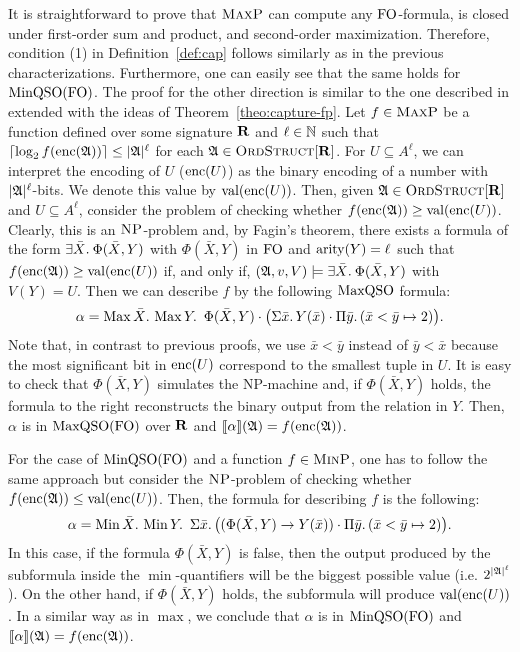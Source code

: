 It is straightforward to prove that $\text{\sc MaxP}$ can compute any ${\rm FO}$-formula, is closed under first-order sum and product, and second-order maximization. 
Therefore, condition (1) in Definition~\ref{def:cap} follows similarly as in the previous characterizations. Furthermore, one can easily see that the same holds for ${\rm MinQSO}({\rm FO})$.
The proof for the other direction is similar to the one described in \cite{kolaitis1994logical} extended with the ideas of Theorem~\ref{theo:capture-fp}. Let $f\in \text{\sc MaxP}$ be a function defined over some signature $\mathbf{R}$ and
$\ell\in\mathbb{N}$ such that $\lceil\log_2 f({\rm enc}(\mathfrak{A})) \rceil \leq |\mathfrak{A}|^\ell$ for each $\mathfrak{A}\in\text{\sc OrdStruct}[\mathbf{R}]$.
For $U \subseteq A^{\ell}$, we can interpret the encoding of $U$ (${\rm enc}(U)$) as the binary encoding of a number with $|\mathfrak{A}|^\ell$-bits. We denote this value by $\text{\rm val}({\rm enc}(U))$.
Then, given $\mathfrak{A}\in\text{\sc OrdStruct}[\mathbf{R}]$ and $U \subseteq A^{\ell}$, consider the problem of checking whether $f({\rm enc}(\mathfrak{A})) \geq \text{\rm val}({\rm enc}(U))$. 
Clearly, this is an $\text{\sc NP}$-problem and, by Fagin's theorem, there exists a formula of the form $\exists{\bar{X}}.\: \Phi(\bar{X}, Y)$ with $\Phi(\bar{X}, Y)$ in ${\rm FO}$ and ${\rm arity}(Y) = \ell$ such that $f({\rm enc}(\mathfrak{A})) \geq \text{\rm val}({\rm enc}(U))$ if, and only if, $(\mathfrak{A},v,V) \models \exists{\bar{X}}.\: \Phi(\bar{X}, Y)$ with $V(Y) = U$. 
Then we can describe $f$ by the following ${\rm MaxQSO}$ formula:
$$
\alpha = \maxa{\bar{X}} \maxa{Y} \ \Phi(\bar{X}, Y) \cdot \big( \sa{\bar{x}} Y(\bar{x}) \cdot \pa{\bar{y}}(\bar{x} < \bar{y} \mapsto 2) \big).
$$
Note that, in contrast to previous proofs, we use $\bar{x} < \bar{y}$ instead of $\bar{y} < \bar{x}$ because the most significant bit in ${\rm enc}(U)$ correspond to the smallest tuple in $U$.  
It is easy to check that $\Phi(\bar{X}, Y)$ simulates the NP-machine and, if $\Phi(\bar{X}, Y)$ holds, the formula to the right  reconstructs the binary output from the relation in $Y$.
Then, $\alpha$ is in ${\rm MaxQSO}({\rm FO})$ over $\mathbf{R}$ and ${\llbracket{}{\alpha}\rrbracket}(\mathfrak{A}) = f({\rm enc}(\mathfrak{A}))$. 

For the case of ${\rm MinQSO}({\rm FO})$ and a function $f \in \text{\sc MinP}$, one has to follow the same approach but consider the $\text{\sc NP}$-problem of checking whether $f({\rm enc}(\mathfrak{A})) \leq \text{\rm val}({\rm enc}(U))$. Then, the formula for describing $f$ is the following:
$$
\alpha = \operatorname{Min}{\bar{X}}.\, \operatorname{Min}{Y}.\, \ \Sigma{\bar{x}}.\, \big( (\Phi(\bar{X}, Y) \rightarrow Y(\bar{x})) \cdot \Pi{\bar{y}}.\,(\bar{x} < \bar{y} \mapsto 2)  \big).
$$
In this case, if the formula $\Phi(\bar{X}, Y)$ is false, then the output produced by the subformula inside the $\min$-quantifiers will be the biggest possible value (i.e. $2^{{|\mathfrak{A}|}^\ell}$).
On the other hand, if $\Phi(\bar{X}, Y)$ holds, the subformula will produce $\text{\rm val}({\rm enc}(U))$. 
In a similar way as in $\max$, we conclude that $\alpha$ is in ${\rm MinQSO}({\rm FO})$ and ${\llbracket{}{\alpha}\rrbracket}(\mathfrak{A}) = f({\rm enc}(\mathfrak{A}))$.
